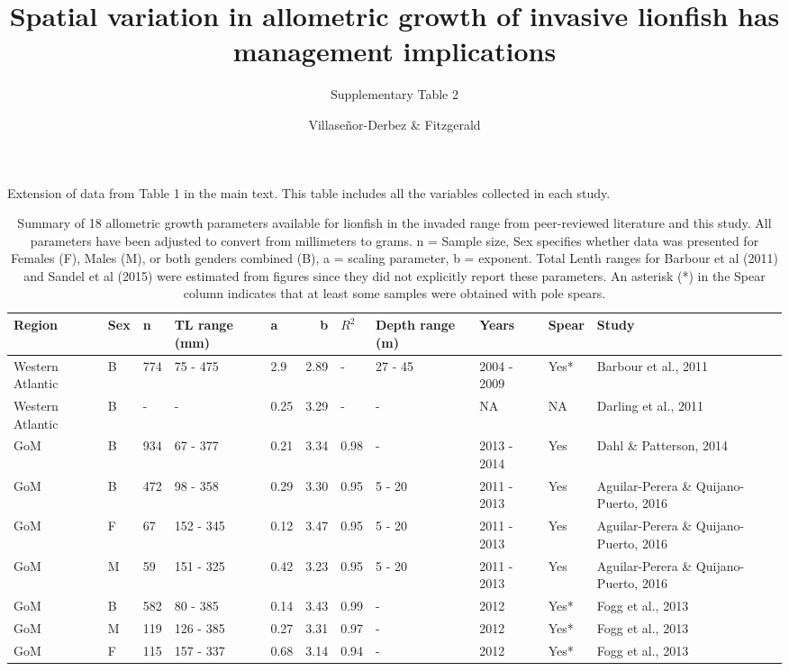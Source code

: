 \documentclass[12pt,]{article}
\title{Spatial variation in allometric growth of invasive lionfish has management implications}
\subtitle{Supplementary Table 2}
\author{Villaseñor-Derbez \& Fitzgerald}
\date{}
\begin{document}
\maketitle

Extension of data from Table 1 in the main text. This table includes all the variables collected in each study.

\begin{landscape}\begin{table}[t]

\caption{\label{tab:unnamed-chunk-1}Summary of 18 allometric growth parameters available for lionfish in the invaded range from peer-reviewed literature and this study. All parameters have been adjusted to convert from millimeters to grams. n = Sample size, Sex specifies whether data was presented for Females (F), Males (M), or both genders combined (B), a = scaling parameter, b = exponent. Total Lenth ranges for Barbour et al (2011) and Sandel et al (2015) were estimated from figures since they did not explicitly report these parameters. An asterisk (*) in the Spear column indicates that at least some samples were obtained with pole spears.}
\centering
\fontsize{10}{12}\selectfont
\begin{tabular}{lllllrlllll}
\toprule
Region & Sex & n & TL range (mm) & a & b & $R^2$ & Depth range (m) & Years & Spear & Study\\
\midrule
Western Atlantic & B & 774 & 75 - 475 & 2.9 & 2.89 & - & 27 - 45 & 2004 - 2009 & Yes* & Barbour et al., 2011\\
Western Atlantic & B & - & - & 0.25 & 3.29 & - & - & NA & NA & Darling et al., 2011\\
GoM & B & 934 & 67 - 377 & 0.21 & 3.34 & 0.98 & - & 2013 - 2014 & Yes & Dahl \& Patterson, 2014\\
GoM & B & 472 & 98 - 358 & 0.29 & 3.30 & 0.95 & 5 - 20 & 2011 - 2013 & Yes & Aguilar-Perera \& Quijano-Puerto, 2016\\
GoM & F & 67 & 152 - 345 & 0.12 & 3.47 & 0.95 & 5 - 20 & 2011 - 2013 & Yes & Aguilar-Perera \& Quijano-Puerto, 2016\\
GoM & M & 59 & 151 - 325 & 0.42 & 3.23 & 0.95 & 5 - 20 & 2011 - 2013 & Yes & Aguilar-Perera \& Quijano-Puerto, 2016\\
GoM & B & 582 & 80 - 385 & 0.14 & 3.43 & 0.99 & - & 2012 & Yes* & Fogg et al., 2013\\
GoM & M & 119 & 126 - 385 & 0.27 & 3.31 & 0.97 & - & 2012 & Yes* & Fogg et al., 2013\\
GoM & F & 115 & 157 - 337 & 0.68 & 3.14 & 0.94 & - & 2012 & Yes* & Fogg et al., 2013\\

\end{tabular}
\end{table}
\end{landscape}
\end{document}

